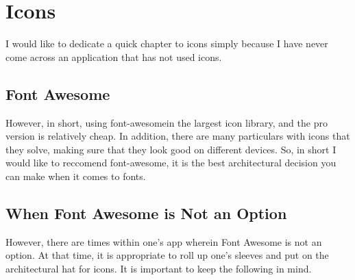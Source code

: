 \maketitle{}
\section{ Icons }

I would like to dedicate a quick chapter to icons simply because I have never
come across an application that has not used icons.

\subsection{ Font Awesome }
However, in short, using font-awesomein the largest icon library, and the pro
version is relatively cheap. In addition, there are many particulars with icons
that they solve, making sure that they look good on different devices. So, in
short I would like to reccomend font-awesome, it is the best architectural
decision you can make when it comes to fonts.

\subsection{ When Font Awesome is Not an Option }
However, there are times within one's app wherein Font Awesome is not an option.
At that time, it is appropriate to roll up one's sleeves and put on the
architectural hat for icons. It is important to keep the following in mind.
